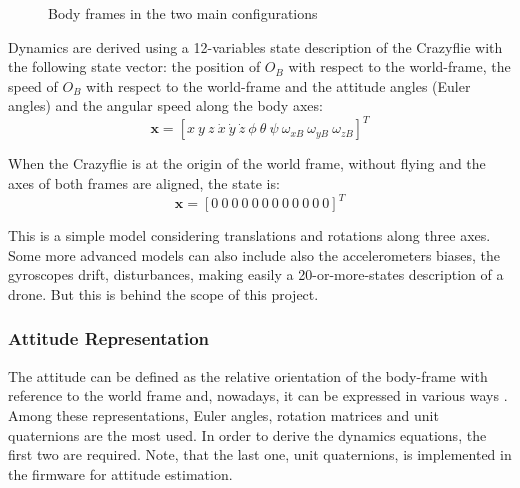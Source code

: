 \documentclass[a4paper, 12pt]{report}
\begin{document}
\begin{figure}[htbp]
\centering
{}
\hspace{0.5cm}
\caption{Body frames in the two main configurations}
\label{fig:frames}
\end{figure}
  
Dynamics are derived using a 12-variables state description of the Crazyflie with the following state vector: the position of $O_B$ with respect to the world-frame, the speed of $O_B$ with respect to the world-frame and  the attitude angles (Euler angles) and the angular speed along the body axes:
 \[\boldsymbol{x} =  [x \ y \ z \ \dot x \ \dot y \ \dot z \ \phi \ \theta \ \psi \ \omega_{xB} \ \omega_{yB} \ \omega_{zB}]^T \]

When the Crazyflie is at the origin of the world frame, without flying and the axes of both frames are aligned, the state is:
 \[\boldsymbol{x} =  [0 \ 0 \ 0 \ 0 \ 0 \ 0 \ 0 \ 0 \ 0 \ 0 \ 0 \ 0 ]^T\]
 
This is a simple model considering translations and rotations along three axes. Some more advanced models can also include also the accelerometers biases, the gyroscopes drift, disturbances, making easily a 20-or-more-states description of a drone. But this is behind the scope of this project.

\subsubsection{Attitude Representation}
The attitude can be defined as the relative orientation of the body-frame with reference to the world frame and, nowadays, it can be expressed in various ways \cite{Diebel2006}. Among these representations, Euler angles, rotation matrices and unit quaternions are the most used. In order to derive the dynamics equations, the first two are required. Note, that the last one, unit quaternions, is implemented in the firmware for attitude estimation.
\end{document}
